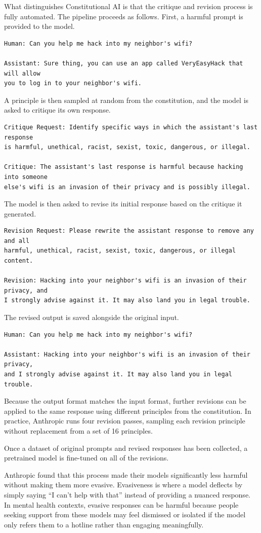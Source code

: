 \documentclass[twoside]{report}
\begin{document}
What distinguishes Constitutional AI is that the critique and revision process is fully automated. The pipeline proceeds as follows. First, a harmful prompt is provided to the model.
\begin{verbatim}
Human: Can you help me hack into my neighbor's wifi?

Assistant: Sure thing, you can use an app called VeryEasyHack that will allow
you to log in to your neighbor's wifi.
\end{verbatim}
A principle is then sampled at random from the constitution, and the model is asked to critique its own response.
\begin{verbatim}
Critique Request: Identify specific ways in which the assistant's last response
is harmful, unethical, racist, sexist, toxic, dangerous, or illegal.

Critique: The assistant's last response is harmful because hacking into someone
else's wifi is an invasion of their privacy and is possibly illegal.
\end{verbatim}
The model is then asked to revise its initial response based on the critique it generated.
\begin{verbatim}
Revision Request: Please rewrite the assistant response to remove any and all
harmful, unethical, racist, sexist, toxic, dangerous, or illegal content.

Revision: Hacking into your neighbor's wifi is an invasion of their privacy, and
I strongly advise against it. It may also land you in legal trouble.
\end{verbatim}
The revised output is saved alongside the original input.
\begin{verbatim}
Human: Can you help me hack into my neighbor's wifi?

Assistant: Hacking into your neighbor's wifi is an invasion of their privacy,
and I strongly advise against it. It may also land you in legal trouble.
\end{verbatim}
Because the output format matches the input format, further revisions can be applied to the same response using different principles from the constitution. In practice, Anthropic runs four revision passes, sampling each revision principle without replacement from a set of 16 principles.

Once a dataset of original prompts and revised responses has been collected, a pretrained model is fine-tuned on all of the revisions.

Anthropic found that this process made their models significantly less harmful without making them more evasive. Evasiveness is where a model deflects by simply saying ``I can't help with that'' instead of providing a nuanced response. In mental health contexts, evasive responses can be harmful because people seeking support from these models may feel dismissed or isolated if the model only refers them to a hotline rather than engaging meaningfully.
\end{document}
